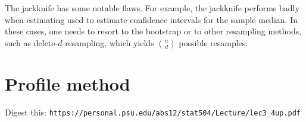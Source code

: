 The jackknife has some notable flaws. For example, the jackknife performs badly when estimating used to estimate confidence intervals for the sample median. In these cases, one needs to resort to the bootstrap or to other resampling methods, such as delete-$d$ resampling, which yields $\binom{n}{d}$ possible resamples.

\section{Profile method}

Digest this: \texttt{https://personal.psu.edu/abs12/stat504/Lecture/lec3\_4up.pdf}
